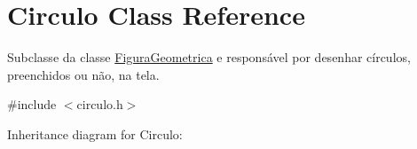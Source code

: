 \hypertarget{class_circulo}{}\section{Circulo Class Reference}
\label{class_circulo}


Subclasse da classe \hyperlink{class_figura_geometrica}{Figura\+Geometrica} e responsável por desenhar círculos, preenchidos ou não, na tela.  




{\ttfamily \#include $<$circulo.\+h$>$}



Inheritance diagram for Circulo\+:
